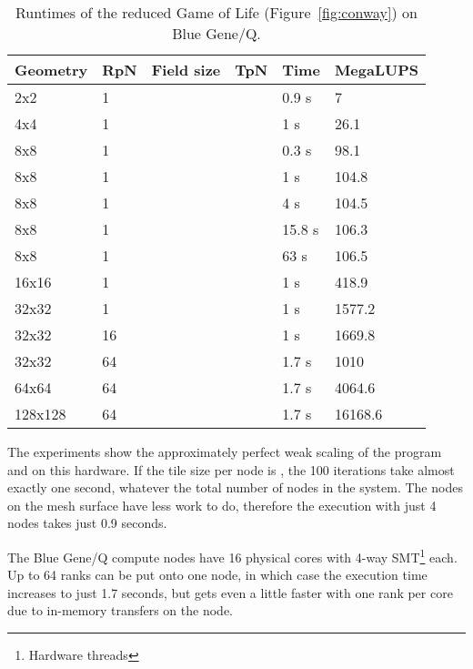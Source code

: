 \documentclass{sigplanconf}
\begin{document}
\begin{table}
\begin{tabular}{llllll}
Geometry & RpN\footnotemark[3] & Field size & TpN\footnotemark[4] & Time & MegaLUPS\footnotemark[5] \\
\hline
2x2           & 1              &   &  &  0.9 s  & 7 \\ 4x4           & 1              &   &  &  1 s   & 26.1 \\ 8x8           & 1              &   &  &  0.3 s  & 98.1 \\ 8x8           & 1              &   &   &  1   s & 104.8 \\ 8x8           & 1              &   &   &  4   s & 104.5  \\ 8x8           & 1              &   &  &  15.8 s  & 106.3 \\ 8x8           & 1              &   &  &  63 s  & 106.5 \\ 16x16         & 1              &   &  &  1 s  & 418.9 \\ 32x32         & 1              &   &  &  1 s  & 1577.2 \\ 32x32         & 16              &   &  &  1 s  & 1669.8 \\ 32x32         & 64              &   &  &  1.7 s  & 1010 \\ 64x64         & 64              &   &  &  1.7 s  & 4064.6 \\ 128x128       & 64              &   &  &  1.7 s  & 16168.6 \\ \end{tabular}
\centering
\caption{Runtimes of the reduced Game of Life (Figure~\ref{fig:conway}) on Blue Gene/Q.}\label{tab:results}
\end{table}

The experiments show the approximately perfect weak scaling of the program and on this hardware. If the tile size per node is , the 100 iterations take almost exactly one second, whatever the total number of nodes in the system. The nodes on the mesh surface have less work to do, therefore the execution with just 4 nodes takes just 0.9 seconds.

The Blue Gene/Q compute nodes have 16 physical cores with 4-way SMT\footnote{Hardware threads} each. Up to 64 ranks can be put onto one node, in which case the execution time increases to just 1.7 seconds, but gets even a little faster with one rank per core due to in-memory transfers on the node.
\end{document}
